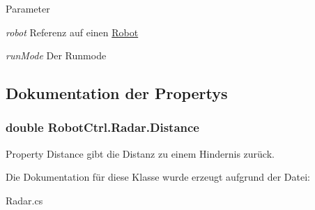 \begin{DoxyParams}{Parameter}
\item[{\em robot}]Referenz auf einen \hyperlink{class_robot_ctrl_1_1_robot}{Robot} \item[{\em runMode}]Der Runmode \end{DoxyParams}


\subsection{Dokumentation der Propertys}
\hypertarget{class_robot_ctrl_1_1_radar_a0339d462806cb7fc3759d850b5564dd9}{
\subsubsection[{Distance}]{\setlength{\rightskip}{0pt plus 5cm}double RobotCtrl.Radar.Distance}}
\label{class_robot_ctrl_1_1_radar_a0339d462806cb7fc3759d850b5564dd9}
Property Distance gibt die Distanz zu einem Hindernis zur\"{u}ck. 

Die Dokumentation für diese Klasse wurde erzeugt aufgrund der Datei:\begin{DoxyCompactItemize}
\item 
Radar.cs\end{DoxyCompactItemize}
